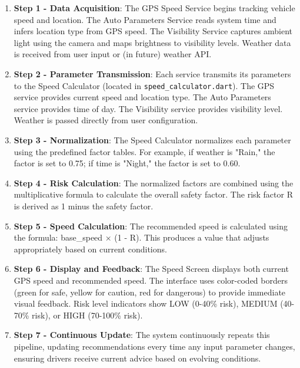 \begin{enumerate}
    \item \textbf{Step 1 - Data Acquisition}: The GPS Speed Service begins tracking vehicle speed and location. The Auto Parameters Service reads system time and infers location type from GPS speed. The Visibility Service captures ambient light using the camera and maps brightness to visibility levels. Weather data is received from user input or (in future) weather API.
    
    \item \textbf{Step 2 - Parameter Transmission}: Each service transmits its parameters to the Speed Calculator (located in \texttt{speed\_calculator.dart}). The GPS service provides current speed and location type. The Auto Parameters service provides time of day. The Visibility service provides visibility level. Weather is passed directly from user configuration.
    
    \item \textbf{Step 3 - Normalization}: The Speed Calculator normalizes each parameter using the predefined factor tables. For example, if weather is "Rain," the factor is set to 0.75; if time is "Night," the factor is set to 0.60.
    
    \item \textbf{Step 4 - Risk Calculation}: The normalized factors are combined using the multiplicative formula to calculate the overall safety factor. The risk factor R is derived as 1 minus the safety factor.
    
    \item \textbf{Step 5 - Speed Calculation}: The recommended speed is calculated using the formula: base\_speed × (1 - R). This produces a value that adjusts appropriately based on current conditions.
    
    \item \textbf{Step 6 - Display and Feedback}: The Speed Screen displays both current GPS speed and recommended speed. The interface uses color-coded borders (green for safe, yellow for caution, red for dangerous) to provide immediate visual feedback. Risk level indicators show LOW (0-40\% risk), MEDIUM (40-70\% risk), or HIGH (70-100\% risk).
    
    \item \textbf{Step 7 - Continuous Update}: The system continuously repeats this pipeline, updating recommendations every time any input parameter changes, ensuring drivers receive current advice based on evolving conditions.
\end{enumerate}

